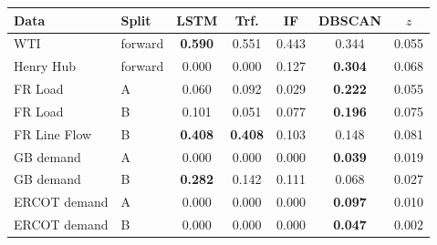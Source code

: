 \begin{tabular}{llccccc}
\toprule
Data & Split & LSTM & Trf. & IF & DBSCAN & $z$ \\
\midrule
WTI & forward & \textbf{0.590} & 0.551 & 0.443 & 0.344 & 0.055 \\
Henry Hub & forward & 0.000 & 0.000 & 0.127 & \textbf{0.304} & 0.068 \\
FR Load & A & 0.060 & 0.092 & 0.029 & \textbf{0.222} & 0.055 \\
FR Load & B & 0.101 & 0.051 & 0.077 & \textbf{0.196} & 0.075 \\
FR Line Flow & B & \textbf{0.408} & \textbf{0.408} & 0.103 & 0.148 & 0.081 \\
GB demand & A & 0.000 & 0.000 & 0.000 & \textbf{0.039} & 0.019 \\
GB demand & B & \textbf{0.282} & 0.142 & 0.111 & 0.068 & 0.027 \\
ERCOT demand & A & 0.000 & 0.000 & 0.000 & \textbf{0.097} & 0.010 \\
ERCOT demand & B & 0.000 & 0.000 & 0.000 & \textbf{0.047} & 0.002 \\
\bottomrule
\end{tabular}
